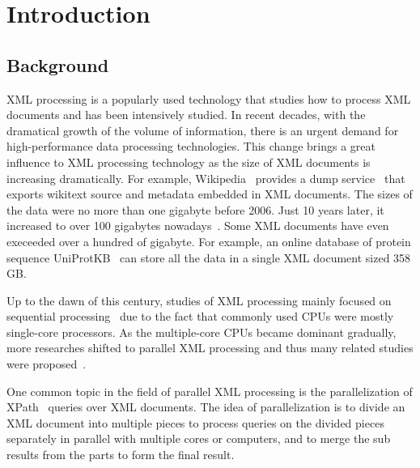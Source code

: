 
\chapter{Introduction}

\section{Background}

XML processing is a popularly used technology that studies how to process  XML
documents and has been intensively studied.  In recent decades, with the
dramatical growth of the volume of information,  there is an urgent demand for
high-performance data processing technologies. This change brings a great
influence to XML processing technology as the size of XML documents is
increasing dramatically.  For example, Wikipedia~\cite{wiki} provides a dump
service~\cite{wikipediadump} that exports wikitext source and metadata embedded
in XML documents. The sizes of the data were no more than one gigabyte before
2006. Just 10 years later, it increased to over 100 gigabytes
nowadays~\cite{wikisize}. Some XML documents have even execeeded over a hundred
of gigabyte. For example, an online database of protein sequence
UniProtKB~\cite{UniProtKB} can store all the data in a single XML document sized
358 GB.

Up to the dawn of this century, studies of XML processing mainly focused on
sequential processing~\cite{Skil97,AlJYK02,Ne02,ToGr02,HAJR03} due to the fact
that commonly used CPUs were mostly single-core processors. As the multiple-core
CPUs became dominant gradually,  more researches shifted to parallel XML
processing  and thus many related studies were
proposed~\cite{SAFu05,PaZC08,LFLQ08,ZhPC10}.



One common topic in the field of parallel XML processing is the parallelization
of XPath~\cite{xpath} queries over XML documents. The idea of parallelization is
to divide an XML document into multiple pieces to process queries on the divided
pieces separately in parallel with multiple cores or computers, and to merge the
sub results from the parts to form the final result. 

